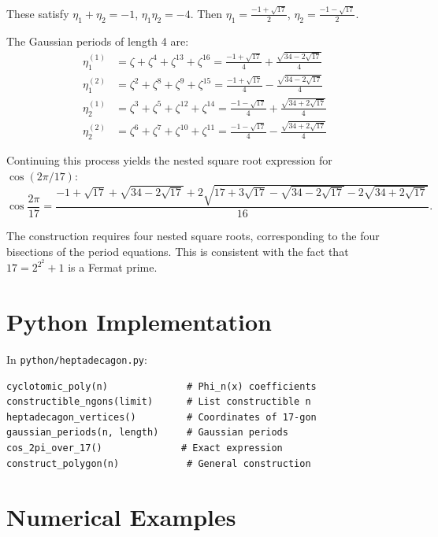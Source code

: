 These satisfy $\eta_1 + \eta_2 = -1$, $\eta_1 \eta_2 = -4$. Then $\eta_1 = \frac{-1 + \sqrt{17}}{2}$, $\eta_2 = \frac{-1 - \sqrt{17}}{2}$.

\begin{theorem}
The Gaussian periods of length 4 are:
\begin{align*}
\eta_1^{(1)} &= \zeta + \zeta^4 + \zeta^{13} + \zeta^{16} = \frac{-1 + \sqrt{17}}{4} + \frac{\sqrt{34-2\sqrt{17}}}{4} \\
\eta_1^{(2)} &= \zeta^2 + \zeta^8 + \zeta^9 + \zeta^{15} = \frac{-1 + \sqrt{17}}{4} - \frac{\sqrt{34-2\sqrt{17}}}{4} \\
\eta_2^{(1)} &= \zeta^3 + \zeta^5 + \zeta^{12} + \zeta^{14} = \frac{-1 - \sqrt{17}}{4} + \frac{\sqrt{34+2\sqrt{17}}}{4} \\
\eta_2^{(2)} &= \zeta^6 + \zeta^7 + \zeta^{10} + \zeta^{11} = \frac{-1 - \sqrt{17}}{4} - \frac{\sqrt{34+2\sqrt{17}}}{4}
\end{align*}
\end{theorem}

Continuing this process yields the nested square root expression for $\cos(2\pi/17)$:
\[
\cos\frac{2\pi}{17} = \frac{-1 + \sqrt{17} + \sqrt{34-2\sqrt{17}} + 2\sqrt{17+3\sqrt{17}-\sqrt{34-2\sqrt{17}}-2\sqrt{34+2\sqrt{17}}}}{16}.
\]

The construction requires four nested square roots, corresponding to the four bisections of the period equations. This is consistent with the fact that $17 = 2^{2^2} + 1$ is a Fermat prime.

\section{Python Implementation}

In \texttt{python/heptadecagon.py}:

\begin{lstlisting}[style=python, caption={Key functions in python/heptadecagon.tex}]
cyclotomic_poly(n)              # Phi_n(x) coefficients
constructible_ngons(limit)      # List constructible n
heptadecagon_vertices()         # Coordinates of 17-gon
gaussian_periods(n, length)     # Gaussian periods
cos_2pi_over_17()              # Exact expression
construct_polygon(n)            # General construction
\end{lstlisting}

\section{Numerical Examples}

